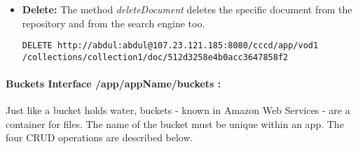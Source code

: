 \begin{itemize}
\item \textbf{Delete:} The method \textit{deleteDocument} deletes the specific document from the repository and from the search engine too.

\begin{code}
\begin{verbatim}
DELETE http://abdul:abdul@107.23.121.185:8080/cccd/app/vod1
/collections/collection1/doc/512d3258e4b0acc3647858f2
\end{verbatim}
\end{code}
 
\end{itemize}
\paragraph{Buckets Interface /app/{appName}/buckets :} Just like a bucket holds water, buckets - known in Amazon Web Services - are a container for files. The name of the bucket must be unique within an app. The four CRUD operations are described below.

